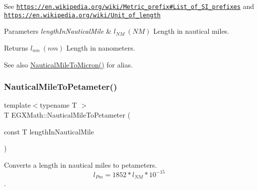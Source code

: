 See \href{https://en.wikipedia.org/wiki/Metric_prefix#List_of_SI_prefixes}{\tt https\+://en.\+wikipedia.\+org/wiki/\+Metric\+\_\+prefix\#\+List\+\_\+of\+\_\+\+S\+I\+\_\+prefixes} and \href{https://en.wikipedia.org/wiki/Unit_of_length}{\tt https\+://en.\+wikipedia.\+org/wiki/\+Unit\+\_\+of\+\_\+length} 
\begin{DoxyParams}{Parameters}
{\em length\+In\+Nautical\+Mile} & $ l_{NM}\ (NM)$ Length in nautical miles. \\
\hline
\end{DoxyParams}
\begin{DoxyReturn}{Returns}
$ l_{nm}\ (nm)$ Length in nanometers. 
\end{DoxyReturn}
\begin{DoxySeeAlso}{See also}
\mbox{\hyperlink{group___e_g_x_math-_conversions-_length_conversions-_nautical-_nautical_mile-_non-_s_i_gad80a4f8f82660ad19a420e55bfb33447}{Nautical\+Mile\+To\+Micron()}} for alias. 
\end{DoxySeeAlso}
\mbox{\label{group___e_g_x_math-_conversions-_length_conversions-_nautical-_nautical_mile-_s_i_ga89c2423e9ccfe76f9a9137060ac23e8d}} 
\subsubsection{\texorpdfstring{Nautical\+Mile\+To\+Petameter()}{NauticalMileToPetameter()}}
{\footnotesize\ttfamily template$<$typename T $>$ \\
T E\+G\+X\+Math\+::\+Nautical\+Mile\+To\+Petameter (\begin{DoxyParamCaption}\item[{const T}]{length\+In\+Nautical\+Mile }\end{DoxyParamCaption})}



Converts a length in nautical miles to petameters. \[ l_{Pm}=1852 * l_{NM} * 10^{-15} \]. 

